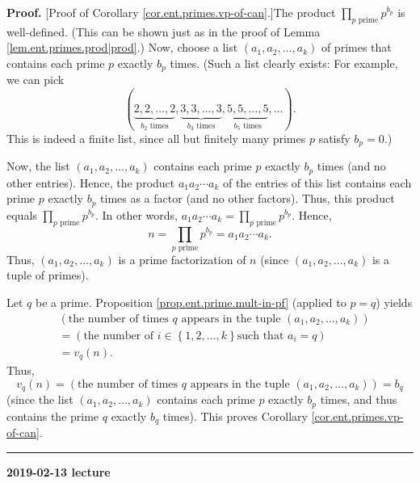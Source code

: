 \documentclass[numbers=enddot,12pt,final,onecolumn,notitlepage]{scrartcl}%
\numberwithin{exer}{subsection}
\theoremstyle{definition}
\newenvironment{proof}[1][Proof]{\noindent\textbf{#1.} }{\ \rule{0.5em}{0.5em}}
\let\prodnonlimits\prod
\renewcommand{\prod}{\prodnonlimits\limits}
\begin{document}
\begin{proof}
[Proof of Corollary \ref{cor.ent.primes.vp-of-can}.]The product $\prod
_{p\text{ prime}}p^{b_{p}}$ is well-defined. (This can be shown just as in the
proof of Lemma \ref{lem.ent.primes.prod|prod}.) Now, choose a list $\left(
a_{1},a_{2},\ldots,a_{k}\right)  $ of primes that contains each prime $p$
exactly $b_{p}$ times. (Such a list clearly exists: For example, we can pick%
\[
\left(  \underbrace{2,2,\ldots,2}_{b_{2}\text{ times}},\underbrace{3,3,\ldots
,3}_{b_{3}\text{ times}},\underbrace{5,5,\ldots,5}_{b_{5}\text{ times}}%
,\ldots\right)  .
\]
This is indeed a finite list, since all but finitely many primes $p$ satisfy
$b_{p}=0$.)

Now, the list $\left(  a_{1},a_{2},\ldots,a_{k}\right)  $ contains each prime
$p$ exactly $b_{p}$ times (and no other entries). Hence, the product
$a_{1}a_{2}\cdots a_{k}$ of the entries of this list contains each prime $p$
exactly $b_{p}$ times as a factor (and no other factors). Thus, this product
equals $\prod_{p\text{ prime}}p^{b_{p}}$. In other words, $a_{1}a_{2}\cdots
a_{k}=\prod_{p\text{ prime}}p^{b_{p}}$. Hence,%
\[
n=\prod_{p\text{ prime}}p^{b_{p}}=a_{1}a_{2}\cdots a_{k}.
\]
Thus, $\left(  a_{1},a_{2},\ldots,a_{k}\right)  $ is a prime factorization of
$n$ (since $\left(  a_{1},a_{2},\ldots,a_{k}\right)  $ is a tuple of primes).

Let $q$ be a prime. Proposition \ref{prop.ent.prime.mult-in-pf} (applied to
$p=q$) yields%
\begin{align*}
&  \left(  \text{the number of times }q\text{ appears in the tuple }\left(
a_{1},a_{2},\ldots,a_{k}\right)  \right) \\
&  =\left(  \text{the number of }i\in\left\{  1,2,\ldots,k\right\}  \text{
such that }a_{i}=q\right) \\
&  =v_{q}\left(  n\right)  .
\end{align*}
Thus,%
\[
v_{q}\left(  n\right)  =\left(  \text{the number of times }q\text{ appears in
the tuple }\left(  a_{1},a_{2},\ldots,a_{k}\right)  \right)  =b_{q}%
\]
(since the list $\left(  a_{1},a_{2},\ldots,a_{k}\right)  $ contains each
prime $p$ exactly $b_{p}$ times, and thus contains the prime $q$ exactly
$b_{q}$ times). This proves Corollary \ref{cor.ent.primes.vp-of-can}.
\end{proof}

\begin{center}
\textbf{2019-02-13 lecture}
\end{center}
\end{document}
